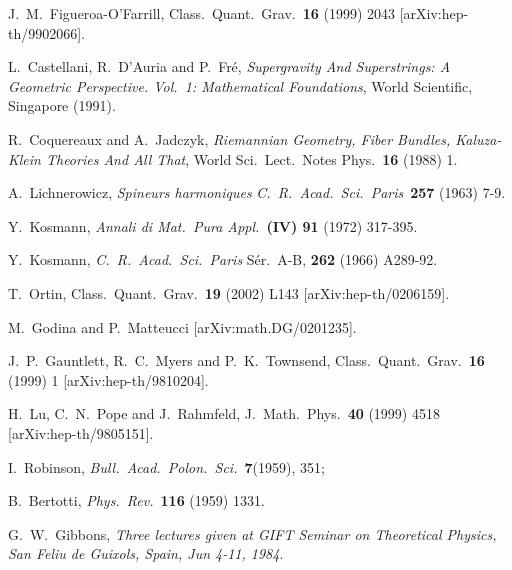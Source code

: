 \documentclass[12pt,a4paper]{article}
\begin{document}
\begin{thebibliography}{40}

J.~M.~Figueroa-O'Farrill,
Class.\ Quant.\ Grav.\  {\bf 16} (1999) 2043
[arXiv:hep-th/9902066].


 L.~Castellani, R.~D'Auria and P.~Fr\'e, 
                        {\sl Supergravity And Superstrings: 
                        A Geometric Perspective. 
                        Vol.~1: Mathematical Foundations}, 
                        World Scientific, Singapore (1991).


R.~Coquereaux and A.~Jadczyk,
{\sl Riemannian Geometry, Fiber Bundles, Kaluza-Klein Theories And All That},
World Sci.\ Lect.\ Notes Phys.\  {\bf 16} (1988) 1.

 A.~Lichnerowicz,
                  {\sl Spineurs harmoniques}
                  {\it C.~R.~Acad.~Sci.~Paris}~\textbf{257} (1963) 7-9.

 Y.~Kosmann,
                 {\it Annali di Mat.~Pura Appl.}~\textbf{(IV) 91}
                 (1972) 317-395.

 Y.~Kosmann,
                 {\it  C.~R.~Acad.~Sci.~Paris} S\'er.~A-B, \textbf{262} 
                 (1966) A289-92.


T.~Ortin,
Class.\ Quant.\ Grav.\  {\bf 19} (2002) L143
[arXiv:hep-th/0206159].

 M.~Godina and  P.~Matteucci
                  [arXiv:math.DG/0201235].

J.~P.~Gauntlett, R.~C.~Myers and P.~K.~Townsend,   
Class.\ Quant.\ Grav.\  {\bf 16} (1999) 1
[arXiv:hep-th/9810204].


H.~Lu, C.~N.~Pope and J.~Rahmfeld,
J.\ Math.\ Phys.\  {\bf 40} (1999) 4518
[arXiv:hep-th/9805151].


 I.~Robinson,
                 {\it Bull.~Acad.~Polon.~Sci.}~\textbf{7}(1959), 351;
               
 B.~Bertotti,
                  {\it Phys.~Rev.}~\textbf{116} (1959) 1331.

G.~W.~Gibbons,
{\it Three lectures given at GIFT Seminar on Theoretical Physics, San Feliu de Guixols, Spain, Jun 4-11, 1984}.


\end{thebibliography}
\end{document}
